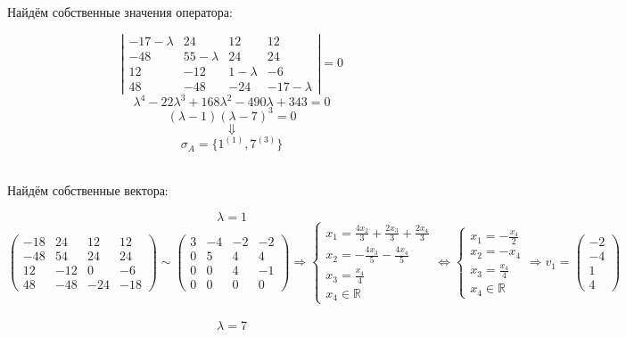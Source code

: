 \documentclass{article}
\begin{document}
\begin{center}
Найдём собственные значения оператора:
\end{center}
$$\left|\begin{matrix}
-17-\lambda & 24 & 12 & 12 \\
-48 & 55-\lambda & 24 & 24 \\
12 & -12 & 1-\lambda & -6 \\
48 & -48 & -24 & -17-\lambda
\end{matrix}\right| = 0$$
$$\lambda^4-22\lambda^3+168\lambda^2-490\lambda+343 = 0$$
$$(\lambda-1)(\lambda-7)^3=0$$
$$\Downarrow$$
$$\sigma_A = \{1^{(1)},7^{(3)}\}$$ \\
\begin{center}
Найдём собственные вектора:
\end{center}
$$\lambda = 1$$
$$\begin{pmatrix}
-18 & 24 & 12 & 12 \\
-48 & 54 & 24 & 24 \\
12 & -12 & 0 & -6 \\
48 & -48 & -24 & -18
\end{pmatrix} \sim \begin{pmatrix}
3 & -4 & -2 & -2 \\
0 & 5 & 4 & 4 \\
0 & 0 & 4 & -1 \\
0 & 0 & 0 & 0
\end{pmatrix} \Rightarrow \begin{cases}
x_1 = \frac{4x_2}{3} + \frac{2x_3}{3} + \frac{2x_4}{3} \\
x_2 = -\frac{4x_3}{5} - \frac{4x_4}{5} \\
x_3 = \frac{x_4}{4} \\
x_4 \in \mathbb{R}
\end{cases} \Leftrightarrow \begin{cases}
x_1 =- \frac{x_4}{2} \\
x_2 = -x_4\\
x_3 = \frac{x_4}{4} \\
x_4 \in \mathbb{R}
\end{cases} \Rightarrow v_1 = \begin{pmatrix}
-2 \\ -4 \\ 1 \\ 4
\end{pmatrix}$$\\
$$\lambda = 7$$
\end{document}
